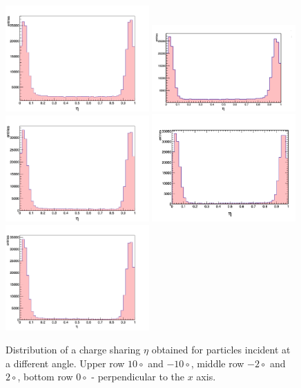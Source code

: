 \begin{figure}[bph]
\begin{center}
\includegraphics[width = 0.49\textwidth]{figures/eta/eta_1d_10.png} 
\includegraphics[width = 0.49\textwidth]{figures/eta/eta_1d_neg10.png}
\includegraphics[width = 0.49\textwidth]{figures/eta/eta_1d_2.png} 
\includegraphics[width = 0.49\textwidth]{figures/eta/eta_1d_neg2.png} 
\includegraphics[width = 0.49\textwidth]{figures/eta/eta_1d_0.png} 

\caption{Distribution of a charge sharing $\eta$ obtained for particles incident at a different angle. Upper row $10\circ$ and $-10\circ$, middle row $-2 \circ$ and $2 \circ$, bottom row $0\circ$ - perpendicular to the $x$ axis.    }
\label{fig:eta_distribution}
 \end{center}
 \end{figure}
 
